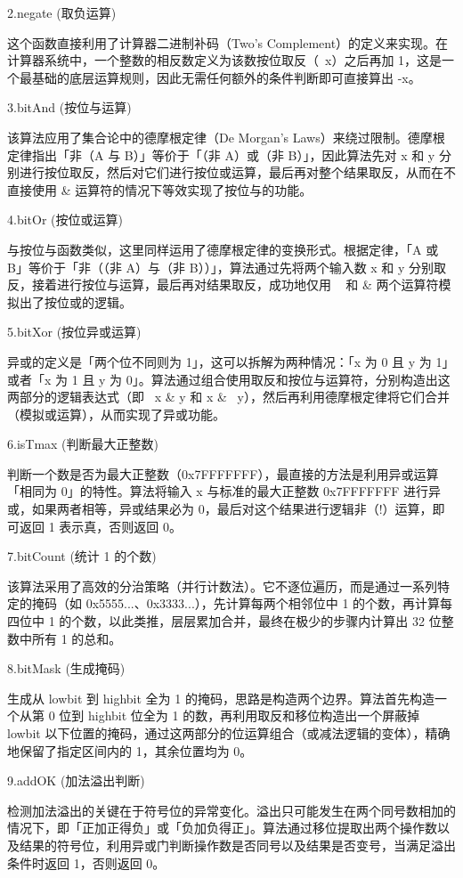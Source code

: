 \documentclass[supercite]{Experimental_Report}
\theoremstyle{definition}
\begin{document}
	2.negate (取负运算) 
	
	这个函数直接利用了计算器二进制补码（Two's Complement）的定义来实现。在计算器系统中，一个整数的相反数定义为该数按位取反（~x）之后再加 1，这是一个最基础的底层运算规则，因此无需任何额外的条件判断即可直接算出 -x。
	
	3.bitAnd (按位与运算) 
	
	该算法应用了集合论中的德摩根定律（De Morgan's Laws）来绕过限制。德摩根定律指出「非（A 与 B）」等价于「（非 A）或（非 B）」，因此算法先对 x 和 y 分别进行按位取反，然后对它们进行按位或运算，最后再对整个结果取反，从而在不直接使用 & 运算符的情况下等效实现了按位与的功能。
	
	4.bitOr (按位或运算) 
	
	与按位与函数类似，这里同样运用了德摩根定律的变换形式。根据定律，「A 或 B」等价于「非（（非 A）与（非 B））」，算法通过先将两个输入数 x 和 y 分别取反，接着进行按位与运算，最后再对结果取反，成功地仅用 ~ 和 \& 两个运算符模拟出了按位或的逻辑。
	
	5.bitXor (按位异或运算) 
	
	异或的定义是「两个位不同则为 1」，这可以拆解为两种情况：「x 为 0 且 y 为 1」或者「x 为 1 且 y 为 0」。算法通过组合使用取反和按位与运算符，分别构造出这两部分的逻辑表达式（即 ~x \& y 和 x \& ~y），然后再利用德摩根定律将它们合并（模拟或运算），从而实现了异或功能。
	
	6.isTmax (判断最大正整数) 
	
	判断一个数是否为最大正整数（0x7FFFFFFF），最直接的方法是利用异或运算「相同为 0」的特性。算法将输入 x 与标准的最大正整数 0x7FFFFFFF 进行异或，如果两者相等，异或结果必为 0，最后对这个结果进行逻辑非（!）运算，即可返回 1 表示真，否则返回 0。
	
	7.bitCount (统计 1 的个数) 
	
	该算法采用了高效的分治策略（并行计数法）。它不逐位遍历，而是通过一系列特定的掩码（如 0x5555...、0x3333...），先计算每两个相邻位中 1 的个数，再计算每四位中 1 的个数，以此类推，层层累加合并，最终在极少的步骤内计算出 32 位整数中所有 1 的总和。
	
	8.bitMask (生成掩码) 
	
	生成从 lowbit 到 highbit 全为 1 的掩码，思路是构造两个边界。算法首先构造一个从第 0 位到 highbit 位全为 1 的数，再利用取反和移位构造出一个屏蔽掉 lowbit 以下位置的掩码，通过这两部分的位运算组合（或减法逻辑的变体），精确地保留了指定区间内的 1，其余位置均为 0。
	
	9.addOK (加法溢出判断) 
	
	检测加法溢出的关键在于符号位的异常变化。溢出只可能发生在两个同号数相加的情况下，即「正加正得负」或「负加负得正」。算法通过移位提取出两个操作数以及结果的符号位，利用异或门判断操作数是否同号以及结果是否变号，当满足溢出条件时返回 1，否则返回 0。
	
\end{document}
